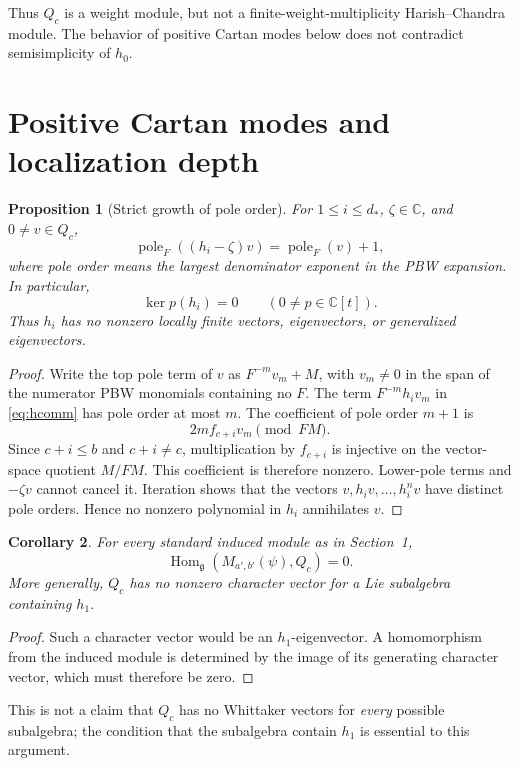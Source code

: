 \documentclass[11pt,a4paper]{article}
\newcommand{\C}{\mathbb C}
\newcommand{\g}{\mathfrak g}
\newcommand{\Hom}{\operatorname{Hom}}
\newcommand{\pole}{\operatorname{pole}}
\theoremstyle{plainupright}
\newtheorem{proposition}{Proposition}[section]
\newtheorem{corollary}[proposition]{Corollary}
\begin{document}
Thus \(Q_c\) is a weight module, but not a finite-weight-multiplicity
Harish--Chandra module. The behavior of positive Cartan modes below
does not contradict semisimplicity of \(h_0\).

\section{Positive Cartan modes and localization depth}

\begin{proposition}[Strict growth of pole order]\label{prop:pole}
For \(1\le i\le d_*\), \(\zeta\in\C\), and \(0\ne v\in Q_c\),
\[
\pole_F((h_i-\zeta)v)=\pole_F(v)+1,
\]
where pole order means the largest denominator exponent in the PBW
expansion. In particular,
\[
\ker p(h_i)=0\qquad(0\ne p\in\C[t]).
\]
Thus \(h_i\) has no nonzero locally finite vectors, eigenvectors,
or generalized eigenvectors.
\end{proposition}
\begin{proof}
Write the top pole term of \(v\) as \(F^{-m}v_m+M\), with \(v_m\ne0\)
in the span of the numerator PBW monomials containing no \(F\).
The term \(F^{-m}h_i v_m\) in \eqref{eq:hcomm} has pole order at most \(m\).
The coefficient of pole order \(m+1\) is
\[
2m f_{c+i}v_m\pmod{FM}.
\]
Since \(c+i\le b\) and \(c+i\ne c\), multiplication by \(f_{c+i}\)
is injective on the vector-space quotient \(M/FM\).
This coefficient is therefore nonzero. Lower-pole terms and \(-\zeta v\)
cannot cancel it. Iteration shows that the vectors
\(v,h_iv,\ldots,h_i^nv\) have distinct pole orders. Hence no nonzero
polynomial in \(h_i\) annihilates \(v\).
\end{proof}

\begin{corollary}\label{cor:no-whittaker}
For every standard induced module as in Section~1,
\[
\Hom_\g(M_{a',b'}(\psi),Q_c)=0.
\]
More generally, \(Q_c\) has no nonzero character vector for a Lie
subalgebra containing \(h_1\).
\end{corollary}
\begin{proof}
Such a character vector would be an \(h_1\)-eigenvector.
A homomorphism from the induced module is determined by the image
of its generating character vector, which must therefore be zero.
\end{proof}

This is not a claim that \(Q_c\) has no Whittaker vectors for
\emph{every} possible subalgebra; the condition that the subalgebra
contain \(h_1\) is essential to this argument.
\end{document}
